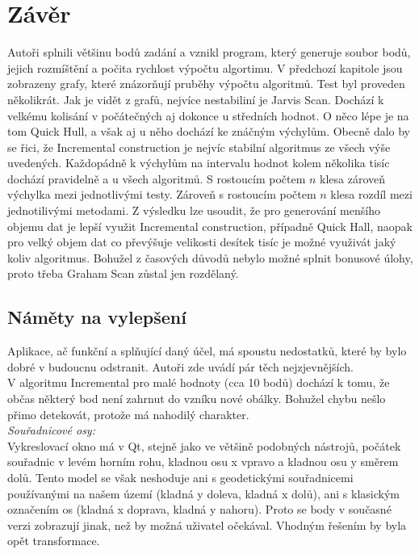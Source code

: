 \documentclass{article}
\begin{document}
\section{Závěr}
\indent Autoři splnili většinu bodů zadání a vznikl program, který generuje soubor bodů, jejich rozmíštění a počita rychlost výpočtu algortimu.
V předchozí kapitole jsou zobrazeny grafy, které znázorňují pruběhy výpočtu algoritmů. Test byl proveden několikrát. Jak je vidět z grafů, nejvíce nestabiliní je Jarvis Scan. Dochází k velkému kolisání v počátečných aj dokonce u středních hodnot. O něco lépe je na tom Quick Hull, a však aj u něho dochází ke znáčným výchylům. Obecně dalo by se řici, že Incremental construction je nejvíc stabilní algoritmus ze všech výše uvedených.
\bigskip
Každopádně k výchylům na intervalu hodnot kolem několika tisíc dochází pravidelně a u všech algoritmů. S rostoucím počtem $n$ klesa zároveň výchylka mezi jednotlivými testy. Zároveň s rostoucím počtem $n$ klesa rozdíl mezi jednotilivými metodami. 
\bigskip
Z výsledku lze usoudit, že pro generování menšího objemu dat je lepší využit Incremental construction, případně Quick Hall, naopak pro velký objem dat co převýšuje velikosti desítek tisíc je možné využivát jaký koliv algoritmus.
Bohužel z časových důvodů nebylo možné splnit bonusové úlohy, proto třeba Graham Scan zůstal jen rozdělaný.
	\subsection{Náměty na vylepšení} %
	\indent Aplikace, ač funkční a splňující daný účel, má spoustu nedostatků, které by bylo dobré v budoucnu odstranit. Autoři zde uvádí pár těch nejzjevnějších. \\
	\bigskip
	V algoritmu Incremental pro malé hodnoty (cca 10 bodů) dochází k tomu, že občas některý bod není zahrnut do vzníku nové obálky. Bohužel chybu nešlo přimo detekovát, protože má nahodilý charakter.\\
	\bigskip \indent \textit{Souřadnicové osy: }
	\\
	 Vykreslovací okno má v Qt, stejně jako ve většině podobných nástrojů, počátek souřadnic v levém horním rohu, kladnou osu x vpravo a kladnou osu y směrem dolů. Tento model se však neshoduje ani s geodetickými souřadnicemi používanými na našem území (kladná y doleva, kladná x dolů), ani s klasickým označením os (kladná x doprava, kladná y nahoru). Proto se body v současné verzi zobrazují jinak, než by možná uživatel očekával. Vhodným řešením by byla opět transformace. \\
	\bigskip 


\pagestyle{empty}

\clearpage

\end{document}
